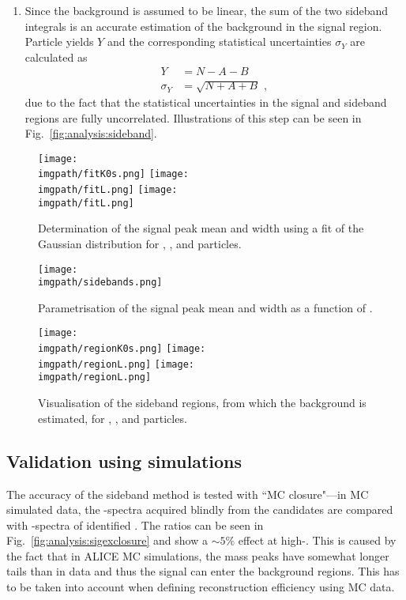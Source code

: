 \begin{enumerate}
\item Since the background is assumed to be linear, the sum of the two sideband integrals is an accurate estimation of the background in the signal region. Particle yields $Y$ and the corresponding statistical uncertainties $\sigma_Y$ are calculated as
\begin{align}
Y &= N - A - B \\
\sigma_Y &= \sqrt{N+A+B} \, \, ,
\end{align}
due to the fact that the statistical uncertainties in the signal and sideband regions are fully uncorrelated. Illustrations of this step can be seen in Fig.~\ref{fig:analysis:sideband}.
\end{enumerate}

\begin{figure}
\texttt{[image: \\imgpath/fitK0s.png]}
\texttt{[image: \\imgpath/fitL.png]}
\texttt{[image: \\imgpath/fitL.png]}
\caption{Determination of the signal peak mean and width using a fit of the Gaussian distribution for \KOs, \LA, and \AL particles.}
\label{fig:analysis:peakfit}
\end{figure}

\begin{figure}
\texttt{[image: \\imgpath/sidebands.png]}
\caption{Parametrisation of the signal peak mean and width as a function of \pt.}
\label{fig:analysis:sigex}
\end{figure}


\begin{figure}
\texttt{[image: \\imgpath/regionK0s.png]}
\texttt{[image: \\imgpath/regionL.png]}
\texttt{[image: \\imgpath/regionL.png]}
\caption{Visualisation of the sideband regions, from which the background is estimated, for \KOs, \LA, and \AL particles.}
\label{fig:analysis:peakfit}
\end{figure}


\subsection{Validation using simulations}

The accuracy of the sideband method is tested with ``MC closure"---in MC simulated data, the \pt-spectra acquired blindly from the \VO candidates are compared with \pt-spectra of identified \VO. The ratios can be seen in Fig.~\ref{fig:analysis:sigexclosure} and show a $\sim5 \%$ effect at high-\pt. This is caused by the fact that in ALICE MC simulations, the \VO mass peaks have somewhat longer tails than in data and thus the signal can enter the background regions. This has to be taken into account when defining reconstruction efficiency using MC data.


